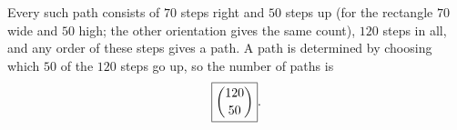 Every such path consists of $70$ steps right and $50$ steps up (for the rectangle $70$ wide and $50$ high; the other orientation gives the same count), $120$ steps in all, and any order of these steps gives a path. A path is determined by choosing which $50$ of the $120$ steps go up, so the number of paths is
\[\boxed{\dbinom{120}{50}}.\]
